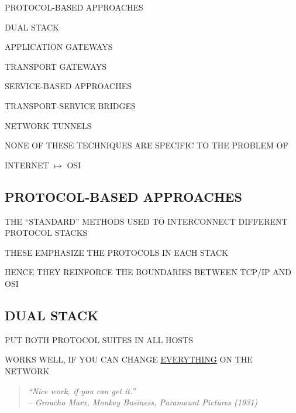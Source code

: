 \begin{bwslide}

\begin{nrtc}
\item	PROTOCOL-BASED APPROACHES
    \begin{nrtc}
    \item	DUAL STACK

    \item	APPLICATION GATEWAYS

    \item	TRANSPORT GATEWAYS
    \end{nrtc}

\item	SERVICE-BASED APPROACHES
    \begin{nrtc}
    \item	TRANSPORT-SERVICE BRIDGES

    \item	NETWORK TUNNELS
    \end{nrtc}

\item	NONE OF THESE TECHNIQUES ARE SPECIFIC TO THE PROBLEM OF
    \begin{nrtc}
    \item	INTERNET $\mapsto$ OSI
    \end{nrtc}
\end{nrtc}
\end{bwslide}


\begin{bwslide}
\part	{PROTOCOL-BASED APPROACHES}\bf

\begin{nrtc}
\item	THE ``STANDARD'' METHODS USED TO INTERCONNECT DIFFERENT
	PROTOCOL STACKS

\item	THESE EMPHASIZE THE PROTOCOLS IN EACH STACK

\item	HENCE THEY REINFORCE THE BOUNDARIES BETWEEN TCP/IP AND OSI
\end{nrtc}
\end{bwslide}


\begin{bwslide}
\part*	{DUAL STACK}\bf

\begin{nrtc}
\item	PUT BOTH PROTOCOL SUITES IN ALL HOSTS

\item	WORKS WELL, IF YOU CAN CHANGE \underline{EVERYTHING} ON THE NETWORK
\begin{quote}\em
``Nice work, if you can get it.''\\ \raggedleft
-- Groucho Marx, Monkey Business, Paramount Pictures (1931)
\end{quote}
\end{nrtc}
\end{bwslide}


